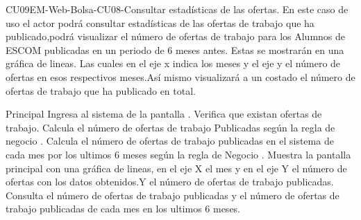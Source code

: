 


	\begin{UseCase}{CU09}{EM-Web-Bolsa-CU08-Consultar estadísticas de las ofertas.}{
		En este caso de uso el actor podrá consultar estadísticas de las ofertas de trabajo que ha publicado,podrá visualizar el número de ofertas de trabajo para los Alumnos de ESCOM publicadas en un periodo de 6 meses antes. Estas se mostrarán en una gráfica de lineas. Las cuales en el eje x indica los meses y el eje y el número de ofertas en esos respectivos meses.Así mismo visualizará a un costado el número de ofertas  de trabajo que ha publicado en total.}


	\end{UseCase}
	\newpage
	
	\begin{UCtrayectoria}{Principal}
	\UCpaso[\UCactor] Ingresa al sistema de la pantalla  .
	\UCpaso Verifica que existan ofertas de trabajo.
	\UCpaso Calcula el número de ofertas de trabajo Publicadas según la regla de negocio  .
	\UCpaso Calcula el número de ofertas de trabajo publicadas en el sistema de cada mes por los ultimos 6 meses según la regla de Negocio .
	\UCpaso Muestra la pantalla principal  con una gráfica de lineas, en el eje X el mes y en el eje Y el número de ofertas con los datos obtenidos.Y el número de ofertas de trabajo publicadas.
 	\UCpaso Consulta el número de ofertas de trabajo publicadas y el número de ofertas de trabajo publicadas de cada mes en los ultimos 6 meses.
	

	\end{UCtrayectoria}


